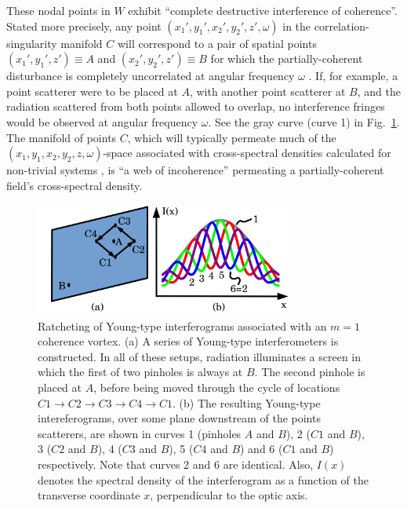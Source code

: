 \documentclass[%
 reprint,
 amsmath,amssymb,
 aps,
]{revtex4-1}
\begin{document}
These nodal points in $W$ exhibit ``complete destructive interference of coherence''.  Stated more precisely, any point $(x_1',y_1',x_2',y_2',z',\omega)$ in the correlation-singularity manifold $C$ will correspond to a pair of spatial points $(x_1',y_1',z')\equiv A$ and $(x_2',y_2',z')\equiv B$ for which the partially-coherent disturbance is completely uncorrelated at angular frequency $\omega$ \cite{Schouten2003,GburVisser2003,Bogatyryova2003}.  If, for example, a point scatterer were to be placed at $A$, with another point scatterer at $B$, and the radiation scattered from both points allowed to overlap, no interference fringes would be observed at angular frequency $\omega$.  See the gray curve (curve 1) in Fig.~\ref{Young_fringe_anholonomy}.  The manifold of points $C$, which will typically permeate much of the $(x_1,y_1,x_2,y_2,z,\omega)$-space associated with cross-spectral densities calculated for non-trivial systems \cite{TopologicalReactionsCohVortices,GburVisser2003}, is ``a web of incoherence'' permeating a partially-coherent field's cross-spectral density.

\begin{figure}
\includegraphics[width=8.5cm]{Figures/Anholonomy.png}
\caption{Ratcheting of Young-type interferograms associated with an $m=1$ coherence vortex.  (a) A series of Young-type interferometers is constructed.  In all of these setups, radiation illuminates a screen in which the first of two pinholes is always at $B$.  The second pinhole is placed at $A$, before being moved through the cycle of locations $C1 \rightarrow C2 \rightarrow C3 \rightarrow C4 \rightarrow C1$.  (b) The resulting Young-type intereferograms, over some plane downstream of the points scatterers, are shown in curves 1 (pinholes $A$ and $B$), 2 ($C1$ and $B$), 3 ($C2$ and $B$), 4 ($C3$ and $B$), 5 ($C4$ and $B$) and 6 ($C1$ and $B$) respectively. Note that curves 2 and 6 are identical.  Also, $I(x)$ denotes the spectral density of the interferogram as a function of the transverse coordinate $x$, perpendicular to the optic axis.}
\label{Young_fringe_anholonomy}
\end{figure}
\end{document}
